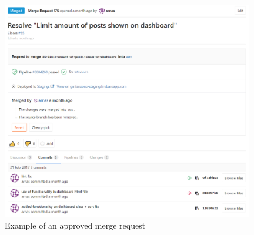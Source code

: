 \begin{figure}[H]
\begin{center}
\includegraphics[width=11cm]{figures/changemgmt_merge_request}
\end{center}
\caption{Example of an approved merge request}
\label{fig:changemgmt_merge_request}
\end{figure}